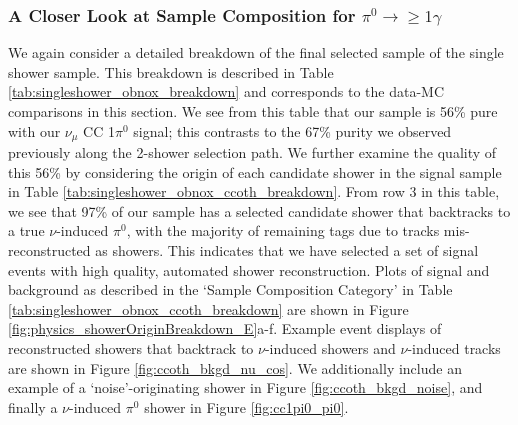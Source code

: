 \subsubsection{A Closer Look at Sample Composition for $\pi^0\rightarrow\geq 1 \gamma$} 
We again consider a detailed breakdown of the final selected sample of the single shower sample.  This breakdown is described in Table \ref{tab:singleshower_obnox_breakdown} and corresponds to the data-MC comparisons in this section. We see from this table that our sample is 56\% pure with our $\nu_\mu$ CC 1$\pi^0$ signal; this contrasts to the 67\% purity we observed previously along the 2-shower selection path.  We further examine the quality of this 56\% by considering the origin of each candidate shower in the signal sample in Table \ref{tab:singleshower_obnox_ccoth_breakdown}.  From row 3 in this table, we see that 97\% of our sample has a selected candidate shower that backtracks to a true $\nu$-induced $\pi^0$, with the majority of remaining tags due to tracks mis-reconstructed as showers. This indicates that we have selected a set of signal events with high quality, automated shower reconstruction.  Plots of signal and background as described in the `Sample Composition Category' in Table \ref{tab:singleshower_obnox_ccoth_breakdown} are shown in Figure \ref{fig:physics_showerOriginBreakdown_E}a-f. Example event displays of reconstructed showers that backtrack to $\nu$-induced showers and $\nu$-induced tracks are shown in Figure \ref{fig:ccoth_bkgd_nu_cos}.  We additionally include an example of a `noise'-originating shower in Figure \ref{fig:ccoth_bkgd_noise}, and finally a $\nu$-induced $\pi^0$ shower in Figure \ref{fig:cc1pi0_pi0}.


